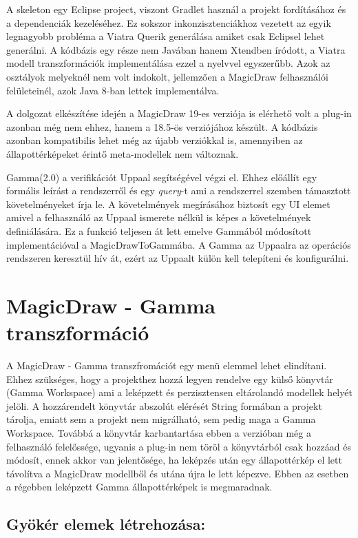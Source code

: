 A skeleton egy Eclipse project, viszont Gradlet használ a projekt fordításához és a dependenciák kezeléséhez. Ez sokszor inkonzisztenciákhoz vezetett az egyik legnagyobb probléma a Viatra Querik generálása amiket csak Eclipsel lehet generálni. A kódbázis egy része nem Javában hanem Xtendben íródott, a Viatra modell transzformációk implementálása ezzel a nyelvvel egyszerűbb. Azok az osztályok melyeknél nem volt indokolt, jellemzően a MagicDraw felhasználói felületeinél, azok Java 8-ban lettek implementálva.

A dolgozat elkészítése idején a MagicDraw 19-es verziója is elérhető volt a plug-in azonban még nem ehhez, hanem a 18.5-ös verziójához készült. A kódbázis azonban kompatibilis lehet még az újabb verziókkal is, amennyiben az állapottérképeket érintő meta-modellek nem változnak.

Gamma(2.0) a verifikációt Uppaal segítségével végzi el. Ehhez előállít egy formális leírást a rendszerről és egy \emph{query}-t ami a rendszerrel szemben támasztott követelményeket írja le. A követelmények megírásához biztosít egy UI elemet amivel a felhasználó az Uppaal ismerete nélkül is képes a követelmények definiálására. Ez a funkció teljesen át lett emelve Gammából módosított implementációval a MagicDrawToGammába. A Gamma az Uppaalra az operációs rendszeren keresztül hív át, ezért az Uppaalt külön kell telepíteni és konfigurálni.

\section{MagicDraw - Gamma transzformáció}

A MagicDraw - Gamma transzfromációt egy menü elemmel lehet elindítani. Ehhez szükséges, hogy a projekthez hozzá legyen rendelve egy külső könyvtár (Gamma Workspace) ami a leképzett és perzisztensen eltárolandó modellek helyét jelöli. A hozzárendelt könyvtár abszolút elérését String formában a projekt tárolja, emiatt sem a projekt nem migrálható, sem pedig maga a Gamma Workspace. Továbbá a könyvtár karbantartása ebben a verzióban még a felhasználó felelőssége, ugyanis a plug-in nem töröl a könyvtárból csak hozzáad és módosít, ennek akkor van jelentősége, ha leképzés után egy állapottérkép el lett távolítva a MagicDraw modellből és utána újra le lett képezve. Ebben az esetben a régebben leképzett Gamma állapottérképek is megmaradnak.

\subsection{Gyökér elemek létrehozása:}

